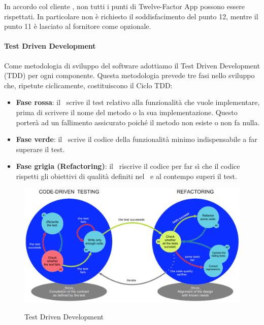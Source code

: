 		In accordo col cliente \II, non tutti i punti di Twelve-Factor App possono essere rispettati. In particolare non è richiesto il soddisfacimento del punto 12, mentre il punto 11 è lasciato al fornitore come opzionale.

		\paragraph{Test Driven Development}\label{tdd}
		Come metodologia di sviluppo del software adottiamo il Test Driven Development (TDD) per ogni componente.
		Questa metodologia prevede tre fasi nello sviluppo che, ripetute ciclicamente, costituiscono il Ciclo TDD:
		\begin{itemize}
			\item \textbf{Fase rossa}: il \Progr\ scrive il test relativo alla funzionalità che vuole implementare, prima di scrivere
				il nome del metodo o la sua implementazione. Questo porterà ad un fallimento assicurato poiché il metodo non esiste o non fa nulla.
			\item \textbf{Fase verde}: il \Progr\ scrive il codice della funzionalità minimo indispensabile a far superare il test.
			\item \textbf{Fase grigia (Refactoring)}: il \Progr\ riscrive il codice per far sì che il codice rispetti
				gli obiettivi di qualità definiti nel \PdQd\ e al contempo superi il test.
		\end{itemize}

		\begin{figure}[H]
			\centering
			\includegraphics[width=\textwidth]{img/tdd.png}\\
			\caption[Test Driven Development]{Test Driven Development\protect\footnotemark}
			\label{TDDfigure}
		\end{figure}


